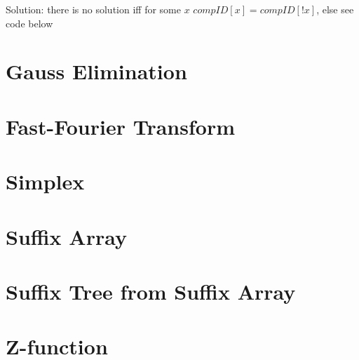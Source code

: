 \documentclass[10pt]{article}
\begin{document}
Solution: there is no solution iff for some $x$ $compID[x] = compID[!x]$, else see code below


\section{Gauss Elimination}

\section{Fast-Fourier Transform}

\section{Simplex}


\section{Suffix Array}

\section{Suffix Tree from Suffix Array}

\section{Z-function}

\end{document}
